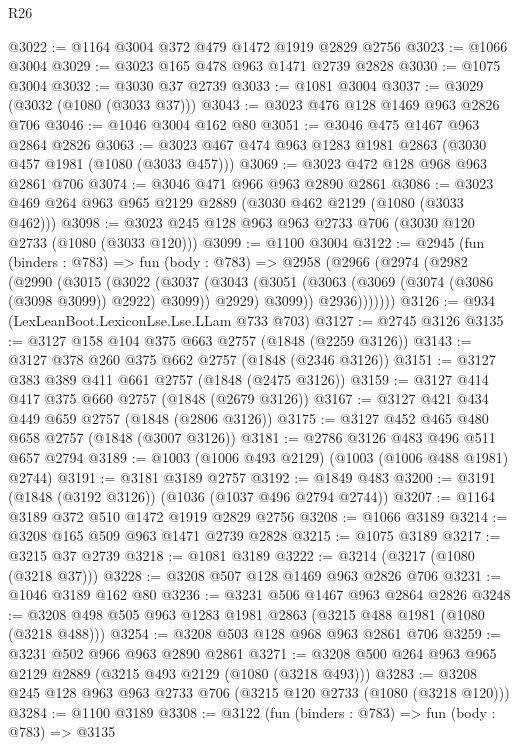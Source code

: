 \begin{lexlean}{R26}
\begin{coremodule}
@3022 := @1164 @3004 @372 @479 @1472 @1919 @2829 @2756
@3023 := @1066 @3004
@3029 := @3023 @165 @478 @963 @1471 @2739 @2828
@3030 := @1075 @3004
@3032 := @3030 @37 @2739
@3033 := @1081 @3004
@3037 := @3029 (@3032 (@1080 (@3033 @37)))
@3043 := @3023 @476 @128 @1469 @963 @2826 @706
@3046 := @1046 @3004 @162 @80
@3051 := @3046 @475 @1467 @963 @2864 @2826
@3063 := @3023 @467 @474 @963 @1283 @1981 @2863 (@3030 @457 @1981 (@1080 (@3033 @457)))
@3069 := @3023 @472 @128 @968 @963 @2861 @706
@3074 := @3046 @471 @966 @963 @2890 @2861
@3086 := @3023 @469 @264 @963 @965 @2129 @2889 (@3030 @462 @2129 (@1080 (@3033 @462)))
@3098 := @3023 @245 @128 @963 @963 @2733 @706 (@3030 @120 @2733 (@1080 (@3033 @120)))
@3099 := @1100 @3004
@3122 := @2945
    (fun (binders : @783) =>
    fun (body : @783) =>
    @2958
      (@2966
        (@2974
          (@2982
            (@2990
              (@3015
                (@3022
                  (@3037
                    (@3043
                      (@3051 (@3063 (@3069 (@3074 (@3086 (@3098 @3099)) @2922) @3099)) @2929)
                      @3099))
                  @2936)))))))
@3126 := @934 (LexLeanBoot.LexiconLse.Lse.LLam @733 @703)
@3127 := @2745 @3126
@3135 := @3127 @158 @104 @375 @663 @2757 (@1848 (@2259 @3126))
@3143 := @3127 @378 @260 @375 @662 @2757 (@1848 (@2346 @3126))
@3151 := @3127 @383 @389 @411 @661 @2757 (@1848 (@2475 @3126))
@3159 := @3127 @414 @417 @375 @660 @2757 (@1848 (@2679 @3126))
@3167 := @3127 @421 @434 @449 @659 @2757 (@1848 (@2806 @3126))
@3175 := @3127 @452 @465 @480 @658 @2757 (@1848 (@3007 @3126))
@3181 := @2786 @3126 @483 @496 @511 @657 @2794
@3189 := @1003 (@1006 @493 @2129) (@1003 (@1006 @488 @1981) @2744)
@3191 := @3181 @3189 @2757
@3192 := @1849 @483
@3200 := @3191 (@1848 (@3192 @3126)) (@1036 (@1037 @496 @2794 @2744))
@3207 := @1164 @3189 @372 @510 @1472 @1919 @2829 @2756
@3208 := @1066 @3189
@3214 := @3208 @165 @509 @963 @1471 @2739 @2828
@3215 := @1075 @3189
@3217 := @3215 @37 @2739
@3218 := @1081 @3189
@3222 := @3214 (@3217 (@1080 (@3218 @37)))
@3228 := @3208 @507 @128 @1469 @963 @2826 @706
@3231 := @1046 @3189 @162 @80
@3236 := @3231 @506 @1467 @963 @2864 @2826
@3248 := @3208 @498 @505 @963 @1283 @1981 @2863 (@3215 @488 @1981 (@1080 (@3218 @488)))
@3254 := @3208 @503 @128 @968 @963 @2861 @706
@3259 := @3231 @502 @966 @963 @2890 @2861
@3271 := @3208 @500 @264 @963 @965 @2129 @2889 (@3215 @493 @2129 (@1080 (@3218 @493)))
@3283 := @3208 @245 @128 @963 @963 @2733 @706 (@3215 @120 @2733 (@1080 (@3218 @120)))
@3284 := @1100 @3189
@3308 := @3122
    (fun (binders : @783) =>
    fun (body : @783) =>
    @3135

\end{coremodule}
\end{lexlean}
